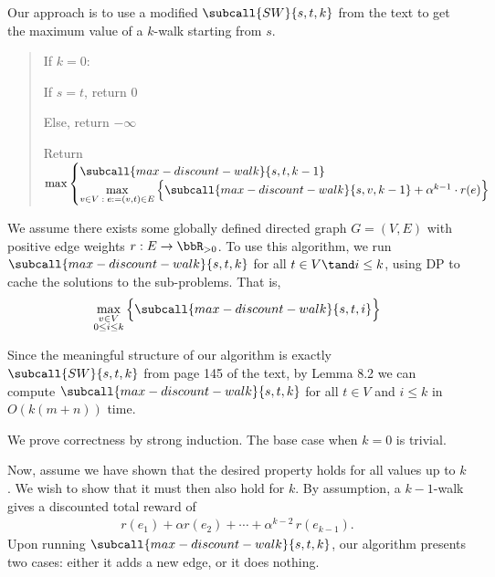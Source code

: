 \documentclass{article}
\begin{document}
\begin{solution} Our approach is to use a modified \( \subcall{SW}{s,t,k} \) from the text to get the maximum value of a \( k \)-walk starting from \( s \).

\begin{quote}%

\begin{steps}
  \item If \( k=0 \): \begin{steps}
    \item If \( s=t \), return 0
    \item Else, return \( -\infty \)
\end{steps}
  \item Return $\max\begin{cases}
  \subcall{max-discount-walk}{s,t,k-1}\\
  \max\limits_{v\in V\;:\;e:=(v, t) \in E}\Big\{ \subcall{max-discount-walk}{s,v,k - 1} + \alpha^{k-1}\cdot r(e)\Big\}
  \end{cases}$
\end{steps}
\end{quote}
We assume there exists some globally defined directed graph \( G=(V,E) \) with positive edge weights \( r:E\to \bbR_{>0} \).
To use this algorithm, we run \( \subcall{max-discount-walk}{s,t,k} \) for all \( t\in V\tand i\leq k \), using DP to cache the solutions to the sub-problems. That is,
\begin{align}
    \max_{\substack{v\in V\\0\leq i \leq k}} \Big\{\subcall{max-discount-walk}{s,t,i}\Big\} \label{eq:call}
\end{align}

\begin{subproof}[Runtime.]
Since the meaningful structure of our algorithm is exactly \( \subcall{SW}{s,t,k} \) from page 145 of the text, by Lemma 8.2 we can compute \( \subcall{max-discount-walk}{s,t,k} \) for all \( t\in V \) and \( i\leq k \) in \( O(k(m + n)) \) time.
\end{subproof}

\begin{subproof}[Correctness.]
We prove correctness by strong induction.
The base case when \( k=0 \) is trivial.

Now, assume we have shown that the desired property holds for all values up to \( k \).
We wish to show that it must then also hold for \( k \).
By assumption, a \( k-1 \)-walk gives a discounted total reward of \begin{align*}
    r(e_1) + \alpha r(e_2)+ \cdots + \alpha^{k-2}\,r(e_{k-1}).
\end{align*}
Upon running \( \subcall{max-discount-walk}{s,t,k} \), our algorithm presents two cases: either it adds a new edge, or it does nothing.


\end{subproof}
\end{solution}
\end{document}
